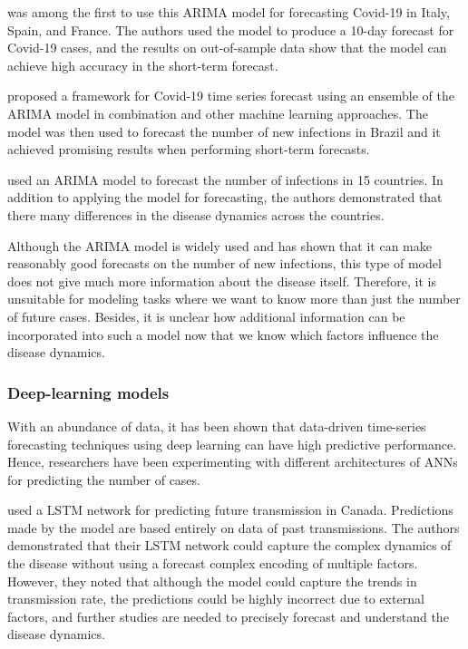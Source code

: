 \citeauthor{ceylanEstimationCOVID19Prevalence2020} \cite{ceylanEstimationCOVID19Prevalence2020} was among the first to use this \gls{ARIMA} model for forecasting Covid-19 in Italy, Spain, and France.
The authors used the model to produce a 10-day forecast for Covid-19 cases, and the results on out-of-sample data show that the model can achieve high accuracy in the short-term forecast.

\citeauthor{ribeiroShorttermForecastingCOVID192020} \cite{ribeiroShorttermForecastingCOVID192020} proposed a framework for Covid-19 time series forecast using an ensemble of the \gls{ARIMA} model in combination and other machine learning approaches.
The model was then used to forecast the number of new infections in Brazil and it achieved promising results when performing short-term forecasts.

\cite{singhPredictionCOVID19Pandemic2020} \cite{singhPredictionCOVID19Pandemic2020} used an \gls{ARIMA} model to forecast the number of infections in 15 countries.
In addition to applying the model for forecasting, the authors demonstrated that there many differences in the disease dynamics across the countries.

Although the \gls{ARIMA} model is widely used and has shown that it can make reasonably good forecasts on the number of new infections, this type of model does not give much more information about the disease itself.
Therefore, it is unsuitable for modeling tasks where we want to know more than just the number of future cases.
Besides, it is unclear how additional information can be incorporated into such a model now that we know which factors influence the disease dynamics.

\subsubsection{Deep-learning models}

With an abundance of data, it has been shown that data-driven time-series forecasting techniques using deep learning can have high predictive performance.
Hence, researchers have been experimenting with different architectures of \glspl{ANN} for predicting the number of cases.

\citeauthor{chimmulaTimeSeriesForecasting2020} \cite{chimmulaTimeSeriesForecasting2020} used a \gls{LSTM} network for predicting future transmission in Canada.
Predictions made by the model are based entirely on data of past transmissions.
The authors demonstrated that their \gls{LSTM} network could capture the complex dynamics of the disease without using a forecast complex encoding of multiple factors.
However, they noted that although the model could capture the trends in transmission rate, the predictions could be highly incorrect due to external factors, and further studies are needed to precisely forecast and understand the disease dynamics.


